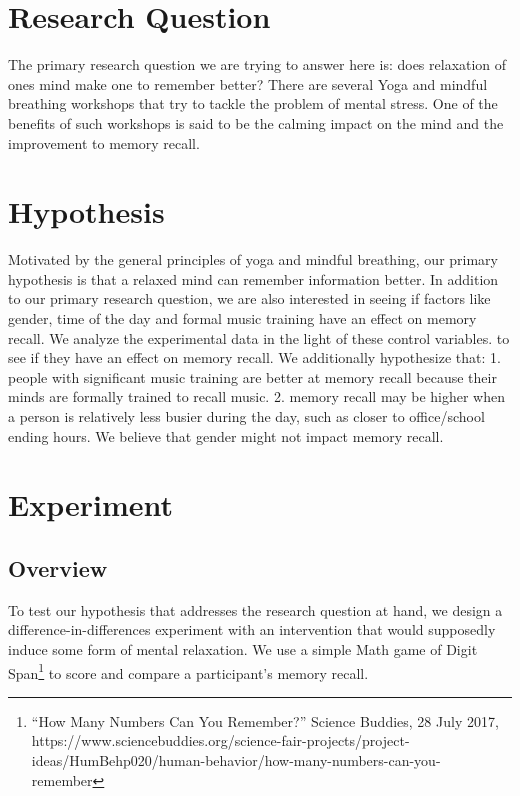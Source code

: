\documentclass[journal,onecolumn, 12pt]{article}
\begin{document}
\section{Research Question}

The primary research question we are trying to answer here is: does relaxation of ones mind make one to remember better? There are several Yoga and mindful breathing workshops that try to tackle the problem of mental stress. One of the benefits of such workshops is said to be the calming impact on the mind and the improvement to memory recall. \\

\section{Hypothesis}
Motivated by the general principles of yoga and mindful breathing, our primary hypothesis is that a relaxed mind can remember information better. In addition to our primary research question, we are also interested in seeing if factors like gender, time of the day and formal music training have an effect on memory recall. We analyze the experimental data in the light of these control variables. to see if they have an effect on memory recall. We additionally hypothesize that: 1. people with significant music training are better at memory recall because their minds are formally trained to recall music. 2. memory recall may be higher when a person is relatively less busier during the day, such as closer to office/school ending hours. We believe that gender might not impact memory recall.

\section {Experiment}

\subsection {Overview}
To test our hypothesis that addresses the research question at hand, we design a difference-in-differences experiment with an intervention that would supposedly induce some form of mental relaxation. We use a simple Math game of Digit Span\footnote {“How Many Numbers Can You Remember?” Science Buddies, 28 July 2017, https://www.sciencebuddies.org/science-fair-projects/project-ideas/HumBehp020/human-behavior/how-many-numbers-can-you-remember} to score and compare a participant's memory recall. \\
\end{document}
